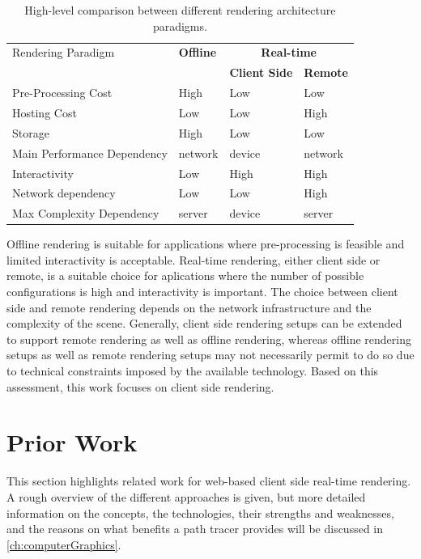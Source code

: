 \begin{table}[H]
  \centering
  \begin{tabular}{@{}p{5cm}p{2.5cm}p{2.5cm}p{2.5cm}@{}}
  \toprule
  Rendering Paradigm & \textbf{Offline} & \multicolumn{2}{c}{\textbf{Real-time}} \\
   &  & \textbf{Client Side} & \textbf{Remote} \\
  Pre-Processing Cost & High & Low & Low \\
  Hosting Cost & Low & Low & High \\
  Storage & High & Low & Low \\
  Main Performance Dependency & network & device & network \\
  Interactivity & Low & High & High \\
  Network dependency & Low & Low & High \\
  Max Complexity Dependency & server & device & server \\
  \bottomrule
  \end{tabular}
  \caption{High-level comparison between different rendering architecture paradigms.}
  \label{tab:paradigmComparison}
\end{table}

Offline rendering is suitable for applications where pre-processing is feasible and limited interactivity is acceptable. Real-time rendering, either client side or remote, is a suitable choice for aplications where the number of possible configurations is high and interactivity is important. The choice between client side and remote rendering depends on the network infrastructure and the complexity of the scene.
Generally, client side rendering setups can be extended to support remote rendering as well as offline rendering, whereas offline rendering setups as well as remote rendering setups may not necessarily permit to do so due to technical constraints imposed by the available technology. Based on this assessment, this work focuses on client side rendering.

\section{Prior Work}

This section highlights related work for web-based client side real-time rendering. A rough overview of the different approaches is given, but more detailed information on the concepts, the technologies, their strengths and weaknesses, and the reasons on what benefits a path tracer provides will be discussed in \autoref{ch:computerGraphics}.

